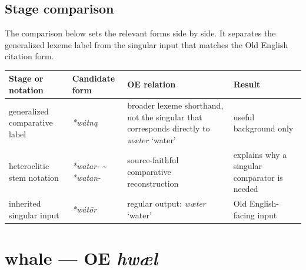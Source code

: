\documentclass[
  british,
  a4paper,
  openany]{book}
\newcounter{none} %
\providecommand{\texorpdfstring}[2]{#1}
\begin{document}
\subsection{Stage comparison}\label{stage-comparison-2}

The comparison below sets the relevant forms side by side. It separates
the generalized lexeme label from the singular input that matches the
Old English citation form.

{\def\LTcaptype{none} %
\begin{longtable}[]{@{}
  >{\raggedright\arraybackslash}p{}
  >{\raggedright\arraybackslash}p{}
  >{\raggedright\arraybackslash}p{}
  >{\raggedright\arraybackslash}p{}@{}}
\toprule\noalign{}
\begin{minipage}[b]{\linewidth}\raggedright
Stage or notation
\end{minipage} & \begin{minipage}[b]{\linewidth}\raggedright
Candidate form
\end{minipage} & \begin{minipage}[b]{\linewidth}\raggedright
OE relation
\end{minipage} & \begin{minipage}[b]{\linewidth}\raggedright
Result
\end{minipage} \\
\midrule\noalign{}
\endhead
\bottomrule\noalign{}
\endlastfoot
generalized comparative label & {\emph{*wátną}} & broader lexeme
shorthand, not the singular that corresponds directly to {\emph{wæter}}
`water' & useful background only \\
heteroclitic stem notation & \emph{*watar-} \textasciitilde{}
\emph{*watan-} & source-faithful comparative reconstruction & explains
why a singular comparator is needed \\
inherited singular input & {\emph{*wátōr}} & regular output:
{\emph{wæter}} `water' & Old English-facing input \\
\end{longtable}
}

\section{\texorpdfstring{whale --- OE
\emph{hwæl}}{whale --- OE hwæl}}\label{whale-oe-hwuxe6l}
\end{document}
